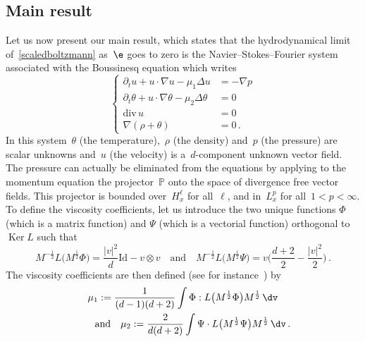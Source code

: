 \subsection{Main result}
Let us now present our main result, which states that the hydrodynamical limit of~\eqref{scaledboltzmann} as~$\e$ goes to zero is the Navier--Stokes--Fourier system associated with the Boussinesq equation which writes
\begin{equation}\label{NSF}
\begin{cases}
\partial_t u + u \cdot \nabla u- \mu_1 \Delta u\!\!\!\! &= - \nabla p \\
\partial_t \theta + u \cdot \nabla \theta- \mu_2 \Delta \theta\!\!\!\! &= 0 \\
\text{div}\, u & = 0 \\
\nabla(\rho+\theta) &= 0 \,.
\end{cases}
\end{equation}
In this system~$\theta$ (the temperature),~$\rho$ (the density) and~$p$ (the pressure) are scalar unknowns and~$u$ (the velocity) is a~$d$-component unknown vector field. The pressure can actually be eliminated from the equations by applying to the momentum equation the projector~${\mathbb P}$ onto the space of divergence free vector fields. This projector is bounded over~$H^\ell_x$ for all~$\ell$, and in~$L^p_x$ for all~$1<p<\infty$. To define the viscosity coefficients, let us introduce the two unique functions $\Phi$ (which is a matrix function) and $\Psi$ (which is a vectorial function) orthogonal to~$\operatorname{Ker} L$ such that
\[
M^{-\frac12}L\big(M^{\frac12} \Phi\big) = \frac{|v|^2}{d } {\text{Id}} -v\otimes v
\quad \text{and} \quad M^{-\frac12}L\big(M^{\frac12} \Psi\big) =v\bigg(\frac{d+2}{2}-\frac{|v|^2}{2}\bigg) \,.
\]
The viscosity coefficients are then defined (see for instance~\cite{bgl1}) by
\begin{multline*}
\mu_1 :=\frac{1}{(d-1)(d+2)}\int\Phi : L\big(M^{\frac12}\Phi\big) M^{\frac12} \, \dv \\\qquad \text{and} \quad
\mu_2 :=\frac{2}{d(d+2)} \int \Psi \cdot L\big(M^{\frac12}\Psi\big) M^{\frac12} \, \dv \,.
\end{multline*}

